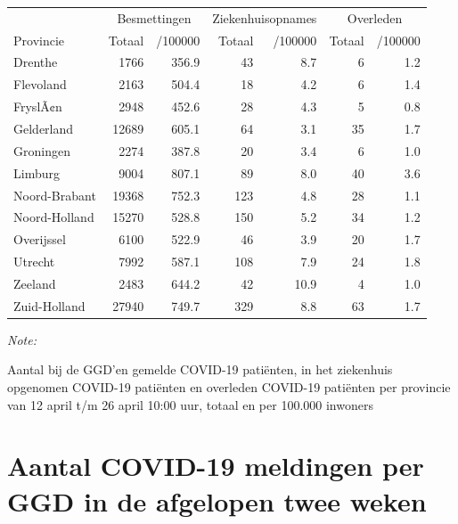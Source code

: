 \documentclass[
  english,
  man,floatsintext]{apa6}
\begin{document}
\begin{table}
\centering
\begin{threeparttable}
\begin{tabular}{lrrrrrr}
\toprule
\multicolumn{1}{c}{ } & \multicolumn{2}{c}{Besmettingen} & \multicolumn{2}{c}{Ziekenhuisopnames} & \multicolumn{2}{c}{Overleden} \\
\cmidrule(l{3pt}r{3pt}){2-3} \cmidrule(l{3pt}r{3pt}){4-5} \cmidrule(l{3pt}r{3pt}){6-7}
Provincie & Totaal & /100000 & Totaal & /100000 & Totaal & /100000\\
\midrule
Drenthe & 1766 & 356.9 & 43 & 8.7 & 6 & 1.2\\
Flevoland & 2163 & 504.4 & 18 & 4.2 & 6 & 1.4\\
FryslÃ¢n & 2948 & 452.6 & 28 & 4.3 & 5 & 0.8\\
Gelderland & 12689 & 605.1 & 64 & 3.1 & 35 & 1.7\\
Groningen & 2274 & 387.8 & 20 & 3.4 & 6 & 1.0\\
Limburg & 9004 & 807.1 & 89 & 8.0 & 40 & 3.6\\
Noord-Brabant & 19368 & 752.3 & 123 & 4.8 & 28 & 1.1\\
Noord-Holland & 15270 & 528.8 & 150 & 5.2 & 34 & 1.2\\
Overijssel & 6100 & 522.9 & 46 & 3.9 & 20 & 1.7\\
Utrecht & 7992 & 587.1 & 108 & 7.9 & 24 & 1.8\\
Zeeland & 2483 & 644.2 & 42 & 10.9 & 4 & 1.0\\
Zuid-Holland & 27940 & 749.7 & 329 & 8.8 & 63 & 1.7\\
\bottomrule
\end{tabular}
\begin{tablenotes}
\item \textit{Note: } 
\item Aantal bij de GGD’en gemelde COVID-19 patiënten, in het ziekenhuis opgenomen COVID-19 patiënten en overleden COVID-19 patiënten per provincie van 12 april t/m 26 april 10:00 uur, totaal en per 100.000 inwoners
\end{tablenotes}
\end{threeparttable}
\end{table}

\newpage

\hypertarget{aantal-covid-19-meldingen-per-ggd-in-de-afgelopen-twee-weken}{%
\section{Aantal COVID-19 meldingen per GGD in de afgelopen twee weken}\label{aantal-covid-19-meldingen-per-ggd-in-de-afgelopen-twee-weken}}
\end{document}
